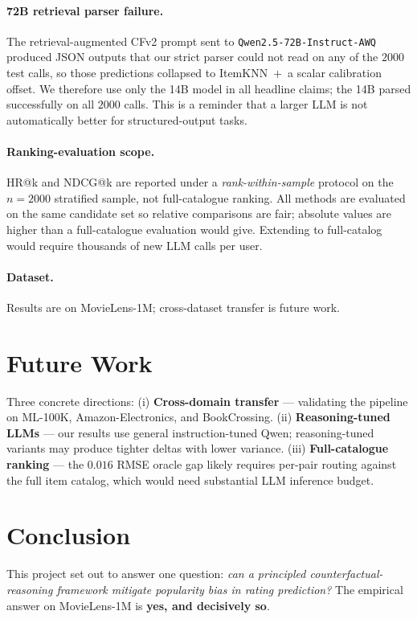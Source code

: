 \documentclass[11pt,a4paper]{article}
\begin{document}
\paragraph{72B retrieval parser failure.}
The retrieval-augmented CFv2 prompt sent to
\texttt{Qwen2.5-72B-Instruct-AWQ} produced JSON outputs that our strict
parser could not read on any of the $2000$ test calls, so those predictions
collapsed to ItemKNN~$+$~a scalar calibration offset. We therefore use only
the 14B model in all headline claims; the 14B parsed successfully on all
$2000$ calls. This is a reminder that a larger LLM is not automatically
better for structured-output tasks.

\paragraph{Ranking-evaluation scope.}
HR@k and NDCG@k are reported under a \emph{rank-within-sample} protocol
on the $n{=}2000$ stratified sample, not full-catalogue ranking. All
methods are evaluated on the same candidate set so relative comparisons
are fair; absolute values are higher than a full-catalogue evaluation
would give. Extending to full-catalog would require thousands of new
LLM calls per user.

\paragraph{Dataset.} Results are on MovieLens-1M; cross-dataset transfer
is future work.

\section{Future Work}
Three concrete directions: (i) \textbf{Cross-domain transfer} ---
validating the pipeline on ML-100K, Amazon-Electronics, and BookCrossing.
(ii) \textbf{Reasoning-tuned LLMs} --- our results use general
instruction-tuned Qwen; reasoning-tuned variants may produce tighter
deltas with lower variance. (iii) \textbf{Full-catalogue ranking} --- the
$0.016$ RMSE oracle gap likely requires per-pair routing against the full
item catalog, which would need substantial LLM inference budget.

\section{Conclusion}

This project set out to answer one question: \emph{can a principled
counterfactual-reasoning framework mitigate popularity bias in rating
prediction?} The empirical answer on MovieLens-1M is \textbf{yes, and
decisively so}.
\end{document}

